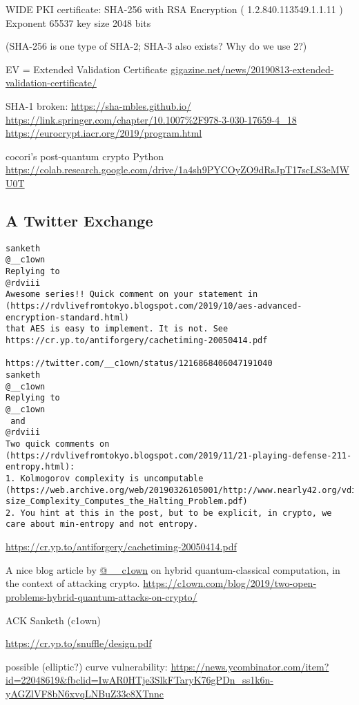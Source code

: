 \documentclass[%
 aip,
 jmp,%
 amsmath,amssymb,
 reprint,%
]{revtex4-1}
\begin{document}
WIDE PKI certificate:
SHA-256 with RSA Encryption ( 1.2.840.113549.1.1.11 )
Exponent 65537
key size 2048 bits

(SHA-256 is one type of SHA-2; SHA-3 also exists? Why do we use 2?)

EV = Extended Validation Certificate
\url{gigazine.net/news/20190813-extended-validation-certificate/}

SHA-1 broken:
\url{https://sha-mbles.github.io/}
\url{https://link.springer.com/chapter/10.1007%2F978-3-030-17659-4_18}
\url{https://eurocrypt.iacr.org/2019/program.html}

cocori's post-quantum crypto Python
\url{https://colab.research.google.com/drive/1a4sh9PYCOyZO9dRsJpT17scLS3eMWU0T}

\subsection{A Twitter Exchange}

\begin{verbatim}
sanketh
@__c1own
Replying to 
@rdviii
Awesome series!! Quick comment on your statement in
(https://rdvlivefromtokyo.blogspot.com/2019/10/aes-advanced-encryption-standard.html)
that AES is easy to implement. It is not. See
https://cr.yp.to/antiforgery/cachetiming-20050414.pdf

https://twitter.com/__c1own/status/1216868406047191040
sanketh
@__c1own
Replying to 
@__c1own
 and 
@rdviii
Two quick comments on (https://rdvlivefromtokyo.blogspot.com/2019/11/21-playing-defense-211-entropy.html):
1. Kolmogorov complexity is uncomputable (https://web.archive.org/web/20190326105001/http://www.nearly42.org/vdisk/articles/Program-size_Complexity_Computes_the_Halting_Problem.pdf)
2. You hint at this in the post, but to be explicit, in crypto, we
care about min-entropy and not entropy.
\end{verbatim}

\url{https://cr.yp.to/antiforgery/cachetiming-20050414.pdf}

A nice blog article by \url{@__c1own} on hybrid quantum-classical computation, in the context of attacking crypto.
\url{https://c1own.com/blog/2019/two-open-problems-hybrid-quantum-attacks-on-crypto/}

ACK Sanketh (c1own)

\url{https://cr.yp.to/snuffle/design.pdf}

possible (elliptic?) curve vulnerability:
\url{https://news.ycombinator.com/item?id=22048619&fbclid=IwAR0HTje3SlkFTaryK76gPDn_ss1k6n-yAGZlVF8bN6xvqLNBuZ33c8XTnnc}
\end{document}
